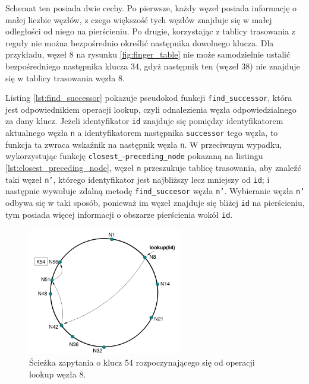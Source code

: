 \documentclass[12pt, twoside, openany]{report}
\begin{document}
Schemat ten posiada dwie cechy. Po pierwsze, każdy węzeł posiada informację o małej liczbie węzłów, z czego większość tych węzłów znajduje się w małej odległości od niego na pierścieniu. Po drugie, korzystając z tablicy trasowania z reguły nie można bezpośrednio określić następnika dowolnego klucza. Dla przykładu, węzeł 8 na rysunku \ref{fig:finger_table} nie może samodzielnie ustalić bezpośredniego następnika klucza 34, gdyż następnik ten (węzeł 38) nie znajduje się w tablicy trasowania węzła 8.

Listing \ref{lst:find_successor} pokazuje pseudokod funkcji \texttt{find\_successor}, która jest odpowiednikiem operacji lookup, czyli odnalezienia węzła odpowiedzialnego za dany klucz. Jeżeli identyfikator \texttt{id} znajduje się pomiędzy identyfikatorem aktualnego węzła \texttt{n} a identyfikatorem następnika \texttt{successor} tego węzła, to funkcja ta zwraca wskaźnik na następnik węzła \texttt{n}. W przeciwnym wypadku, wykorzystując funkcję \texttt{closest\_}-\texttt{preceding\_node} pokazaną na listingu \ref{lst:closest_preceding_node}, węzeł \texttt{n} przeszukuje tablicę trasowania, aby znaleźć taki węzeł \texttt{n'}, którego identyfikator jest najbliższy lecz mniejszy od \texttt{id}; i następnie wywołuje zdalną metodę \texttt{find\_succesor} węzła \texttt{n'}. Wybieranie węzła \texttt{n'} odbywa się w taki sposób, ponieważ im węzeł znajduje się bliżej \texttt{id} na pierścieniu, tym posiada więcej informacji o obszarze pierścienia wokół \texttt{id}.





\begin{figure}[H]
\centering
\includegraphics[width=0.6\textwidth,height=\textheight,keepaspectratio]{lookup_example.png}
\caption{Ścieżka zapytania o klucz 54 rozpoczynającego się od operacji lookup węzła 8.}
\label{fig:lookup_example}
\end{figure}
\end{document}
